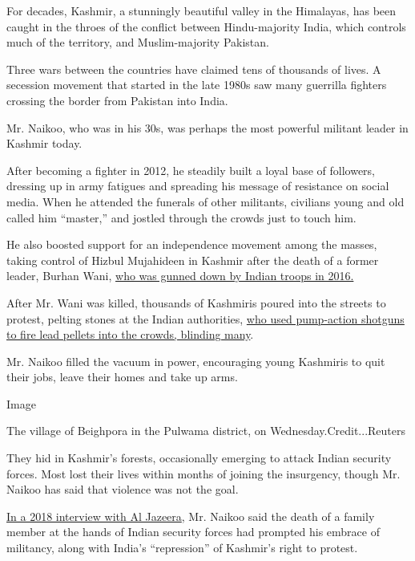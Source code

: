 For decades, Kashmir, a stunningly beautiful valley in the Himalayas,
has been caught in the throes of the conflict between Hindu-majority
India, which controls much of the territory, and Muslim-majority
Pakistan.

Three wars between the countries have claimed tens of thousands of
lives. A secession movement that started in the late 1980s saw many
guerrilla fighters crossing the border from Pakistan into India.

Mr. Naikoo, who was in his 30s, was perhaps the most powerful militant
leader in Kashmir today.

After becoming a fighter in 2012, he steadily built a loyal base of
followers, dressing up in army fatigues and spreading his message of
resistance on social media. When he attended the funerals of other
militants, civilians young and old called him ``master,'' and jostled
through the crowds just to touch him.

He also boosted support for an independence movement among the masses,
taking control of Hizbul Mujahideen in Kashmir after the death of a
former leader, Burhan Wani,
\href{https://www.nytimes.com/2016/07/17/world/asia/how-killing-of-prominent-separatist-set-off-turmoil-in-kashmir.html}{who
was gunned down by Indian troops in 2016.}

After Mr. Wani was killed, thousands of Kashmiris poured into the
streets to protest, pelting stones at the Indian authorities,
\href{https://www.nytimes.com/2016/08/29/world/asia/pellet-guns-used-in-kashmir-protests-cause-dead-eyes-epidemic.html}{who
used pump-action shotguns to fire lead pellets into the crowds, blinding
many}.

Mr. Naikoo filled the vacuum in power, encouraging young Kashmiris to
quit their jobs, leave their homes and take up arms.

Image

The village of Beighpora in the Pulwama district, on
Wednesday.Credit...Reuters

They hid in Kashmir's forests, occasionally emerging to attack Indian
security forces. Most lost their lives within months of joining the
insurgency, though Mr. Naikoo has said that violence was not the goal.

\href{https://www.aljazeera.com/news/2018/11/qa-hizbul-mujahideen-leader-surrender-181109111719903.html}{In
a 2018 interview with Al Jazeera}, Mr. Naikoo said the death of a family
member at the hands of Indian security forces had prompted his embrace
of militancy, along with India's ``repression'' of Kashmir's right to
protest.

